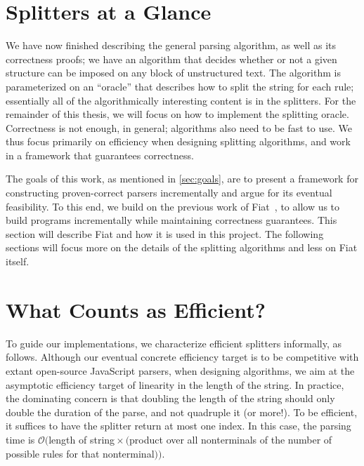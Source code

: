 \section{Splitters at a Glance}
  We have now finished describing the general parsing algorithm, as well as its correctness proofs; we have an algorithm that decides whether or not a given structure can be imposed on any block of unstructured text.  The algorithm is parameterized on an ``oracle'' that describes how to split the string for each rule; essentially all of the algorithmically interesting content is in the splitters.  For the remainder of this thesis, we will focus on how to implement the splitting oracle.  Correctness is not enough, in general; algorithms also need to be fast to use.  We thus focus primarily on efficiency when designing splitting algorithms, and work in a framework that guarantees correctness.
  
  The goals of this work, as mentioned in \autoref{sec:goals}, are to present a framework for constructing proven-correct parsers incrementally and argue for its eventual feasibility.  To this end, we build on the previous work of Fiat~\cite{delaware2015fiat}, to allow us to build programs incrementally while maintaining correctness guarantees.  This section will describe Fiat and how it is used in this project.  The following sections will focus more on the details of the splitting algorithms and less on Fiat itself.
  
\section{What Counts as Efficient?}
  To guide our implementations, we characterize efficient splitters informally, as follows.  Although our eventual concrete efficiency target is to be competitive with extant open-source JavaScript parsers, when designing algorithms, we aim at the asymptotic efficiency target of linearity in the length of the string.  In practice, the dominating concern is that doubling the length of the string should only double the duration of the parse, and not quadruple it (or more!).  %
  To be efficient, it suffices to have the splitter return at most one index.  In this case, the parsing time is $\mathcal O($length of string${} \times ($product over all nonterminals of the number of possible rules for that nonterminal$))$.
    

